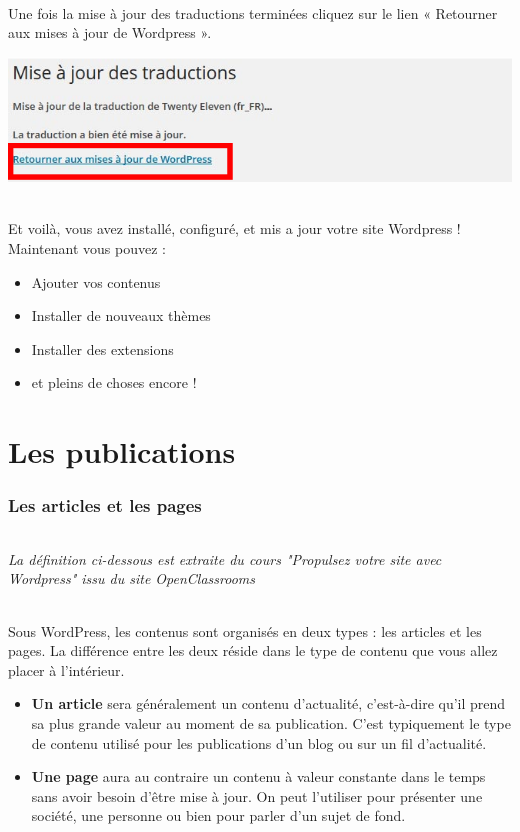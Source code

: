 \documentclass[10pt,a4paper]{article}
\begin{document}
\paragraph{}Une fois la mise à jour des traductions terminées cliquez sur le lien « Retourner aux mises à jour de Wordpress ».
\begin{center}
\includegraphics[scale=0.35]{img/0058.png}
\end{center}
\paragraph{}Et voilà, vous avez installé, configuré, et mis a jour votre site Wordpress ! Maintenant vous pouvez :
\begin{itemize}
\item Ajouter vos contenus
\item Installer de nouveaux thèmes
\item Installer des extensions
\item et pleins de choses encore !
\end{itemize}
\newpage

\part{Les publications}
\newpage

\section{Les articles et les pages}
\paragraph{} \begin{center}\textit{La définition ci-dessous est extraite du cours "Propulsez votre site avec Wordpress" issu du site OpenClassrooms}\end{center}
\paragraph{} Sous WordPress, les contenus sont organisés en deux types : les articles et les pages. La différence entre les deux réside dans le type de contenu que vous allez placer à l’intérieur.
\begin{itemize}
\item \textbf{Un article} sera généralement un contenu d’actualité, c’est-à-dire qu’il prend sa plus grande valeur au moment de sa publication. C’est typiquement le type de contenu utilisé pour les publications d’un blog ou sur un fil d’actualité.
\item \textbf{Une page} aura au contraire un contenu à valeur constante dans le temps sans avoir besoin d’être mise à jour. On peut l’utiliser pour présenter une société, une personne ou bien pour parler d’un sujet de fond.
\end{itemize}
\end{document}
